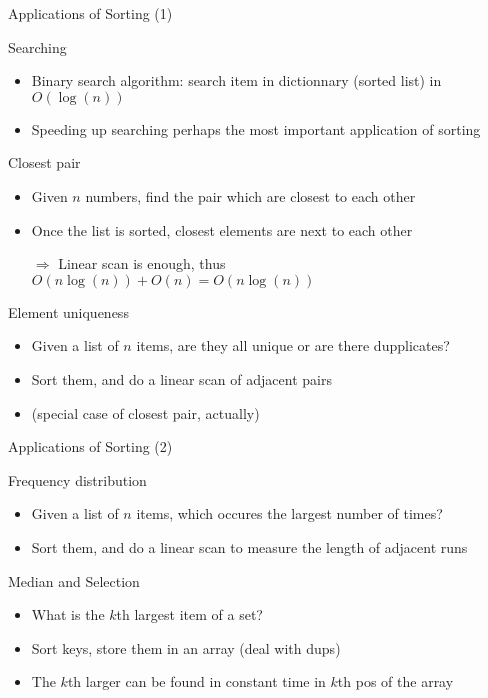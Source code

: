 \begin{frame}{Applications of Sorting (1)}
  \begin{block}{Searching}
    \begin{itemize}
    \item Binary search algorithm: search item in dictionnary (sorted list) in
      $O(\log(n))$
    \item Speeding up searching perhaps the most important application of
      sorting 
    \end{itemize}
  \end{block}

  \begin{block}{Closest pair}
    \begin{itemize}
    \item Given $n$ numbers, find the pair which are closest to each other
    \item Once the list is sorted, closest elements are next to each other
    \item[$\Rightarrow$] Linear scan is enough, thus
      $O(n\log(n))+O(n)=O(n\log(n))$ 
    \end{itemize}
  \end{block}

  \begin{block}{Element uniqueness}
    \begin{itemize}
    \item Given a list of $n$ items, are they all unique or are there
      dupplicates? 
    \item Sort them, and do a linear scan of adjacent pairs
    \item (special case of closest pair, actually)
    \end{itemize}
  \end{block}
\end{frame}
\begin{frame}{Applications of Sorting (2)}
  \begin{block}{Frequency distribution}
    \begin{itemize}
    \item Given a list of $n$ items, which occures the largest number of times?
    \item Sort them, and do a linear scan to measure the length of adjacent runs
    \end{itemize}
  \end{block}
  \begin{block}{Median and Selection}
    \begin{itemize}
    \item What is the $k$th largest item of a set?
    \item Sort keys, store them in an array (deal with dups)
    \item The $k$th larger can be found in constant time in $k$th pos of the
      array 
    \end{itemize}
  \end{block}
\end{frame}

